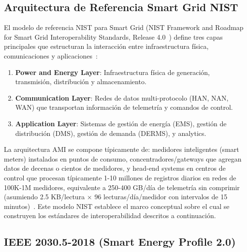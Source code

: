 \subsection{Arquitectura de Referencia Smart Grid NIST}

El modelo de referencia NIST para Smart Grid (NIST Framework and Roadmap for Smart Grid Interoperability Standards, Release 4.0~\cite{NISTFramework2022}) define tres capas principales que estructuran la interacción entre infraestructura física, comunicaciones y aplicaciones~\cite{alsuwaidiSecuringSmartGrid2024}:

\begin{enumerate}
\item \textbf{Power and Energy Layer}: Infraestructura física de generación, transmisión, distribución y almacenamiento.
\item \textbf{Communication Layer}: Redes de datos multi-protocolo (HAN, NAN, WAN) que transportan información de telemetría y comandos de control.
\item \textbf{Application Layer}: Sistemas de gestión de energía (EMS), gestión de distribución (DMS), gestión de demanda (DERMS), y analytics.
\end{enumerate}

La arquitectura AMI se compone típicamente de: medidores inteligentes (smart meters) instalados en puntos de consumo, concentradores/gateways que agregan datos de decenas o cientos de medidores, y head-end systems en centros de control que procesan típicamente 1-10 millones de registros diarios en redes de 100K-1M medidores, equivalente a 250-400 GB/día de telemetría sin comprimir (asumiendo 2.5 KB/lectura $\times$ 96 lecturas/día/medidor con intervalos de 15 minutos)~\cite{alsafranChallengesImplementingIoT2025}. Este modelo NIST establece el marco conceptual sobre el cual se construyen los estándares de interoperabilidad descritos a continuación.

\subsection{IEEE 2030.5-2018 (Smart Energy Profile 2.0)}

